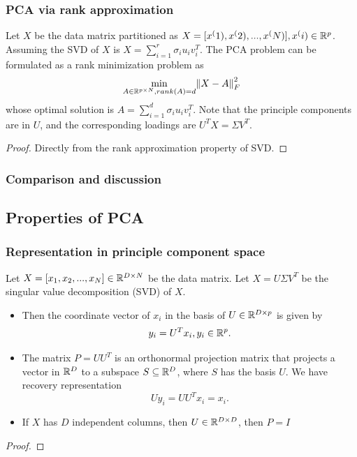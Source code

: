 \begin{refsection}
\subsubsection{PCA via rank approximation}
\begin{theorem}
Let $X$ be the data matrix partitioned as $X=[x^(1),x^(2),...,x^(N)],x^(i)\in \mathbb{R}^p$. Assuming the SVD of $X$ is $X=\sum_{i=1}^r \sigma_i u_iv_i^T$. The PCA problem can be formulated as a rank minimization problem as
$$\min_{A\in \mathbb{R}^{p\times N}, rank(A)=d} \norm{X-A}^2_F$$
whose optimal solution is $A = \sum_{i=1}^d \sigma_i u_iv_i^T$. Note that the principle components are in $U$, and the corresponding loadings are $U^TX = \Sigma V^T$.
\end{theorem}
\begin{proof}
Directly from the rank approximation property of SVD.
\end{proof}

\subsubsection{Comparison and discussion}



\subsection{Properties of PCA}
\subsubsection{Representation in principle component space}

\begin{lemma}
Let $X = [x_1,x_2,...,x_N] \in \mathbb{R}^{D\times N}$ be the data matrix. Let $X = U\Sigma V^T$ be the singular value decomposition (SVD) of $X$. 
\begin{itemize}
	\item Then the coordinate vector of $x_i$ in the basis of $U\in \mathbb{R}^{D\times p}$ is given by
	$$y_i = U^Tx_i, y_i\in \mathbb{R}^p.$$
	\item The matrix $P=UU^T$ is an orthonormal projection matrix that projects a vector in $\mathbb{R}^D$ to a subspace $S\subseteq \mathbb{R}^D$, where $S$ has the basis $U$. We have recovery representation
	$$Uy_i = UU^Tx_i = x_i.$$
	\item If $X$ has $D$ independent columns, then $U\in \mathbb{R}^{D\times D}$, then $P = I$
\end{itemize}
\end{lemma}
\begin{proof}


\end{proof}
\end{refsection}
